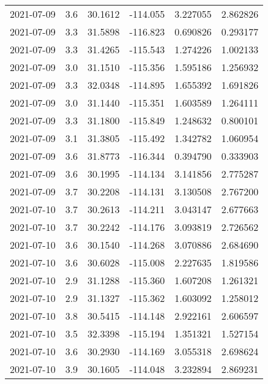 \begin{tabular}{lrrrrr}
2021-07-09 &       3.6 &  30.1612 &  -114.055 &         3.227055 &         2.862826 \\
2021-07-09 &       3.3 &  31.5898 &  -116.823 &         0.690826 &         0.293177 \\
2021-07-09 &       3.3 &  31.4265 &  -115.543 &         1.274226 &         1.002133 \\
2021-07-09 &       3.0 &  31.1510 &  -115.356 &         1.595186 &         1.256932 \\
2021-07-09 &       3.3 &  32.0348 &  -114.895 &         1.655392 &         1.691826 \\
2021-07-09 &       3.0 &  31.1440 &  -115.351 &         1.603589 &         1.264111 \\
2021-07-09 &       3.3 &  31.1800 &  -115.849 &         1.248632 &         0.800101 \\
2021-07-09 &       3.1 &  31.3805 &  -115.492 &         1.342782 &         1.060954 \\
2021-07-09 &       3.6 &  31.8773 &  -116.344 &         0.394790 &         0.333903 \\
2021-07-09 &       3.6 &  30.1995 &  -114.134 &         3.141856 &         2.775287 \\
2021-07-09 &       3.7 &  30.2208 &  -114.131 &         3.130508 &         2.767200 \\
2021-07-10 &       3.7 &  30.2613 &  -114.211 &         3.043147 &         2.677663 \\
2021-07-10 &       3.7 &  30.2242 &  -114.176 &         3.093819 &         2.726562 \\
2021-07-10 &       3.6 &  30.1540 &  -114.268 &         3.070886 &         2.684690 \\
2021-07-10 &       3.6 &  30.6028 &  -115.008 &         2.227635 &         1.819586 \\
2021-07-10 &       2.9 &  31.1288 &  -115.360 &         1.607208 &         1.261321 \\
2021-07-10 &       2.9 &  31.1327 &  -115.362 &         1.603092 &         1.258012 \\
2021-07-10 &       3.8 &  30.5415 &  -114.148 &         2.922161 &         2.606597 \\
2021-07-10 &       3.5 &  32.3398 &  -115.194 &         1.351321 &         1.527154 \\
2021-07-10 &       3.6 &  30.2930 &  -114.169 &         3.055318 &         2.698624 \\
2021-07-10 &       3.9 &  30.1605 &  -114.048 &         3.232894 &         2.869231 \\

\end{tabular}
